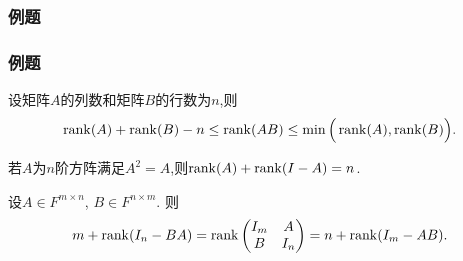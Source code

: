\begin{frame}\frametitle{例题}
\begin{example}\frametitle{例题}
设矩阵$A$的列数和矩阵$B$的行数为$n$,则
\[\operatorname{rank}(A)+\operatorname{rank}(B)-n\leq \operatorname{rank}(AB)\leq \min\Big(\operatorname{rank}(A),\operatorname{rank}(B)\Big).\]
\end{example}
\pp

\begin{example}若$A$为$n$阶方阵满足$A^2=A$,则$\operatorname{rank}(A)+\operatorname{rank}(I-A)=n$.
\end{example}
\pp
\begin{example}
设$A\in F^{m\times n}$, $B\in F^{n\times m}$. 则
\[m+\operatorname{rank}(I_n-BA) = \operatorname{rank}\begin{pmatrix}I_m&A\\B&I_n\end{pmatrix} =n+\operatorname{rank}(I_m-AB).\]
\end{example}
\end{frame}







